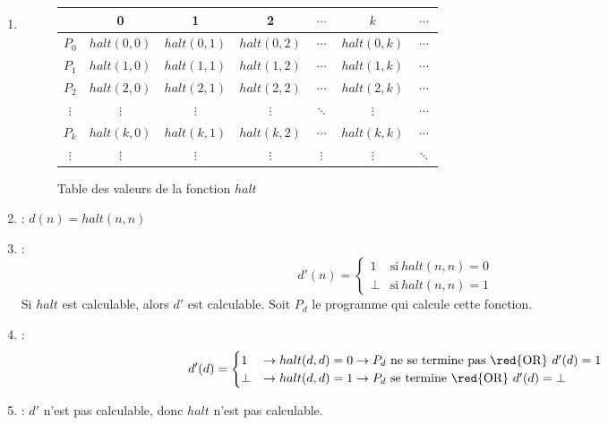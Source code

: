 \begin{enumerate}
\item {}
	\begin{figure}[H]
    		\centering
    		\begin{tabular}{c|cccccc}
		 & 0 & 1 & 2 & $\cdots$ & $k$ & $\cdots$ \\ 
		\hline 
		$P_0$ & $halt(0,0)$ & $halt(0,1)$ & $halt(0,2)$ & $\cdots$ & $halt(0,k)$ & $\cdots$ \\ 
		$P_1$ & $halt(1,0)$ & $halt(1,1)$ & $halt(1,2)$ & $\cdots$ & $halt(1,k)$ & $\cdots$ \\ 
		$P_2$ & $halt(2,0)$ & $halt(2,1)$ & $halt(2,2)$ & $\cdots$ & $halt(2,k)$ & $\cdots$ \\ 
		$\vdots$ & $\vdots$ & $\vdots$ & $\vdots$ & $\ddots$ & $\vdots$ & $\cdots$ \\ 
		$P_k$ & $halt(k,0)$ & $halt(k,1)$ & $halt(k,2)$ & $\cdots$ & $halt(k,k)$ & $\cdots$ \\ 
		$\vdots$ & $\vdots$ & $\vdots$ & $\vdots$ & $\vdots$ & $\vdots$ & $\ddots$ \\ 
		\end{tabular}
		\caption{Table des valeurs de la fonction $halt$}
	\end{figure}
\item {} : $d(n) = halt(n,n)$
\item {} :
	\begin{equation*}
		d'(n)=
		\begin{cases}
      		1 & \text{si}\ halt(n, n) = 0\\
      		\bot & \text{si}\ halt(n,n) = 1
      	\end{cases}
    \end{equation*}
    Si $halt$ est calculable, alors $d'$ est calculable. Soit $P_d$ le programme qui calcule cette fonction.
\item {} :
	\begin{equation*}
		d'(d)=
		\begin{cases}
      		1 & \rightarrow halt(d,d) = 0 \rightarrow P_d \text{ ne se termine pas \red{OR} }d'(d) = 1\\
      		\bot & \rightarrow halt(d,d) = 1 \rightarrow P_d \text{ se termine \red{OR} }d'(d) = \bot
      	\end{cases}
    \end{equation*}
\item {} : $d'$ n'est pas calculable, donc $halt$ n'est pas calculable.
\end{enumerate}

